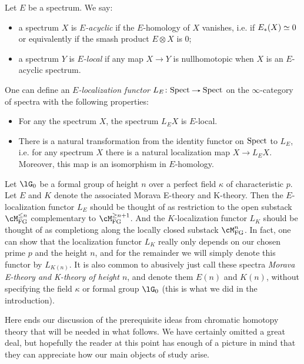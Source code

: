 \begin{definition}
  \label{chrom-localization}
  Let $E$ be a spectrum. We say:
  \begin{itemize}
  \item a spectrum $X$ is \emph{$E$-acyclic} if the $E$-homology of
    $X$ vanishes, i.e. if $E_*(X) \simeq 0$ or equivalently if the smash
    product $E \otimes X$ is $0$;
  \item a spectrum $Y$ is \emph{$E$-local} if any map $X \to Y$ is
    nullhomotopic when $X$ is an $E$-acyclic spectrum.
  \end{itemize}
  One can define an \emph{$E$-localization functor}
  $L_E \c \Spect \to \Spect$ on the $\infty$-category of spectra with
  the following properties:
  \begin{itemize}
  \item For any the spectrum $X$, the spectrum $L_E X$ is $E$-local.
  \item There is a natural transformation from the identity functor on
    $\mathrm{Spect}$ to $L_E$, i.e. for any spectrum $X$ there is a natural
    localization map $X \to L_E X$. Moreover, this map is an
    isomorphism in $E$-homology.
  \end{itemize}
\end{definition}

\begin{examples}
  Let $\lG_0$ be a formal group of height $n$ over a perfect field
  $\kappa$ of characteristic $p$. Let $E$ and $K$ denote the
  associated Morava E-theory and K-theory. Then the $E$-localization
  functor $L_E$ should be thought of as restriction to the open
  substack $\cM_\FG^{\le n}$ complementary to $\cM_\FG^{\ge n+1}$. And
  the $K$-localization functor $L_K$ should be thought of as
  completiong along the locally closed substack $\cM_\FG^n$. In fact,
  one can show that the localization functor $L_K$ really only depends
  on our chosen prime $p$ and the height $n$, and for the remainder we
  will simply denote this functor by $L_{K(n)}$. It is also common to
  abusively just call these spectra \emph{Morava E-theory and K-theory
    of height $n$}, and denote them $E(n)$ and $K(n)$, without
  specifying the field $\kappa$ or formal group $\lG_0$ (this is what
  we did in the introduction).
\end{examples}

Here ends our discussion of the prerequisite ideas from chromatic
homotopy theory that will be needed in what follows. We have certainly
omitted a great deal, but hopefully the reader at this point has
enough of a picture in mind that they can appreciate how our main
objects of study arise.

